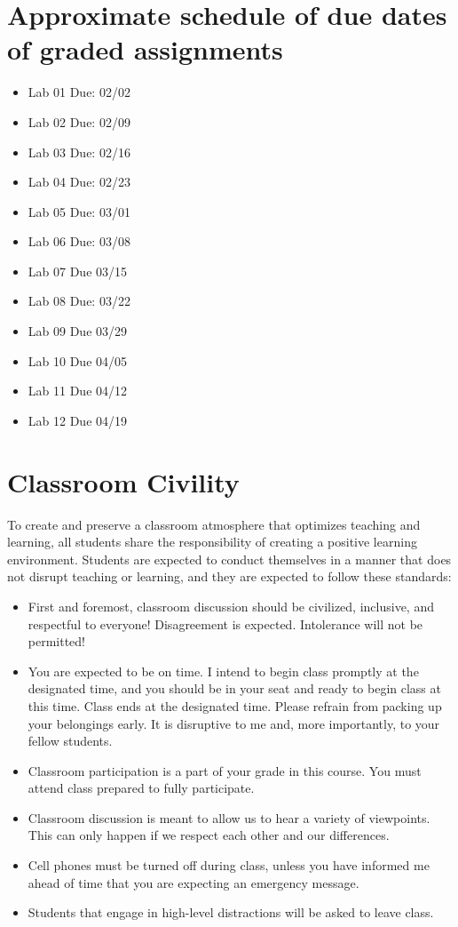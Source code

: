 \documentclass[11pt, a4paper]{article}
\begin{document}
\section*{Approximate schedule of due dates of graded assignments}
\begin{itemize}
\item Lab 01 Due: 02/02
\item Lab 02 Due: 02/09
\item Lab 03 Due: 02/16
\item Lab 04 Due: 02/23
\item Lab 05 Due: 03/01
\item Lab 06 Due: 03/08
\item Lab 07 Due 03/15
\item Lab 08 Due: 03/22
\item Lab 09 Due 03/29
\item Lab 10 Due 04/05
\item Lab 11 Due 04/12
\item Lab 12 Due 04/19
\end{itemize}

\section*{Classroom Civility}
To create and preserve a classroom atmosphere that optimizes teaching and learning, all students share the responsibility of creating a positive learning environment. Students are expected to conduct themselves in a manner that does not disrupt teaching or learning, and they are expected to follow these standards:
\begin{itemize}
\item First and foremost, classroom discussion should be civilized, inclusive, and respectful to everyone! Disagreement is expected. Intolerance will not be permitted!
\item You are expected to be on time. I intend to begin class promptly at the designated time, and you should be in your seat and ready to begin class at this time. Class ends at the designated time. Please refrain from packing up your belongings early. It is disruptive to me and, more importantly, to your fellow students.
\item Classroom participation is a part of your grade in this course. You must attend class prepared to fully participate. 
\item Classroom discussion is meant to allow us to hear a variety of viewpoints. This can only happen if we respect each other and our differences.
\item Cell phones must be turned off during class, unless you have informed me ahead of time that you are expecting an emergency message.
\item Students that engage in high-level distractions will be asked to leave class. 
\end{itemize}
\end{document}
